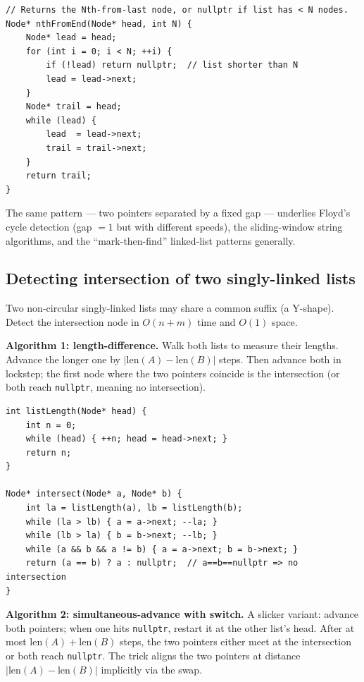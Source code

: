 \documentclass[11pt]{article}
\begin{document}
\begin{lstlisting}[basicstyle=\ttfamily\small,frame=single]
// Returns the Nth-from-last node, or nullptr if list has < N nodes.
Node* nthFromEnd(Node* head, int N) {
    Node* lead = head;
    for (int i = 0; i < N; ++i) {
        if (!lead) return nullptr;  // list shorter than N
        lead = lead->next;
    }
    Node* trail = head;
    while (lead) {
        lead  = lead->next;
        trail = trail->next;
    }
    return trail;
}
\end{lstlisting}

The same pattern --- two pointers separated by a fixed gap ---
underlies Floyd's cycle detection (gap $= 1$ but with different
speeds), the sliding-window string algorithms, and the
``mark-then-find'' linked-list patterns generally.

\subsection*{Detecting intersection of two singly-linked lists}

Two non-circular singly-linked lists may share a common suffix
(a Y-shape). Detect the intersection node in $O(n + m)$ time and
$O(1)$ space.

\textbf{Algorithm 1: length-difference.} Walk both lists to
measure their lengths. Advance the longer one by
$|\text{len}(A) - \text{len}(B)|$ steps. Then advance both in
lockstep; the first node where the two pointers coincide is the
intersection (or both reach \texttt{nullptr}, meaning no
intersection).

\begin{lstlisting}[basicstyle=\ttfamily\small,frame=single]
int listLength(Node* head) {
    int n = 0;
    while (head) { ++n; head = head->next; }
    return n;
}

Node* intersect(Node* a, Node* b) {
    int la = listLength(a), lb = listLength(b);
    while (la > lb) { a = a->next; --la; }
    while (lb > la) { b = b->next; --lb; }
    while (a && b && a != b) { a = a->next; b = b->next; }
    return (a == b) ? a : nullptr;  // a==b==nullptr => no intersection
}
\end{lstlisting}

\textbf{Algorithm 2: simultaneous-advance with switch.} A
slicker variant: advance both pointers; when one hits
\texttt{nullptr}, restart it at the other list's head. After at
most $\text{len}(A) + \text{len}(B)$ steps, the two pointers
either meet at the intersection or both reach \texttt{nullptr}.
The trick aligns the two pointers at distance
$|\text{len}(A) - \text{len}(B)|$ implicitly via the swap.
\end{document}
